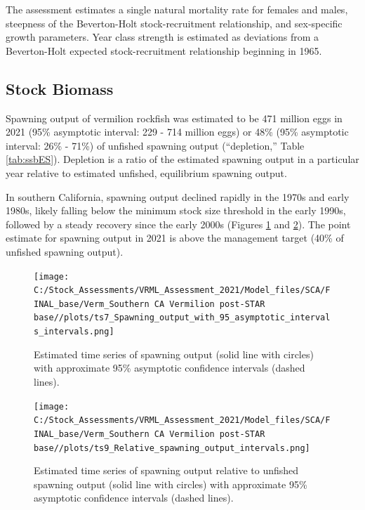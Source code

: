 \documentclass[
  english,
  a4paper,
]{article}
\begin{document}
The assessment estimates a single natural mortality rate for females and males,
steepness of the Beverton-Holt stock-recruitment relationship, and sex-specific
growth parameters. Year class strength is estimated as deviations from a Beverton-Holt expected stock-recruitment relationship beginning in 1965.

\FloatBarrier

\hypertarget{stock-biomass}{%
\subsection*{Stock Biomass}\label{stock-biomass}}

Spawning output of vermilion rockfish was estimated to be
471 million eggs in 2021 (95\% asymptotic interval:
229 - 714 million eggs) or
48\%
(95\% asymptotic interval:
26\% - 71\%)
of unfished spawning output (``depletion,'' Table \ref{tab:ssbES}). Depletion
is a ratio of the estimated spawning output in a particular year relative to
estimated
unfished, equilibrium spawning output.

In southern California, spawning output declined rapidly in the 1970s and early 1980s, likely falling below the minimum stock size threshold in the early 1990s, followed by a steady recovery since the early 2000s (Figures \ref{fig:ssbES} and \ref{fig:deplES}). The point estimate for spawning output in 2021 is above the management target (40\% of unfished spawning output).

\begin{figure}
\centering
\texttt{[image: C:/Stock\_Assessments/VRML\_Assessment\_2021/Model\_files/SCA/FINAL\_base/Verm\_Southern CA Vermilion post-STAR base//plots/ts7\_Spawning\_output\_with\_95\_asymptotic\_intervals\_intervals.png]}
\caption{Estimated time series of spawning output (solid line with circles) with approximate 95\% asymptotic confidence intervals (dashed lines).\label{fig:ssbES}}
\end{figure}

\begin{figure}
\centering
\texttt{[image: C:/Stock\_Assessments/VRML\_Assessment\_2021/Model\_files/SCA/FINAL\_base/Verm\_Southern CA Vermilion post-STAR base//plots/ts9\_Relative\_spawning\_output\_intervals.png]}
\caption{Estimated time series of spawning output relative to unfished spawning output (solid line with circles) with approximate 95\% asymptotic confidence intervals (dashed lines).\label{fig:deplES}}
\end{figure}
\end{document}
